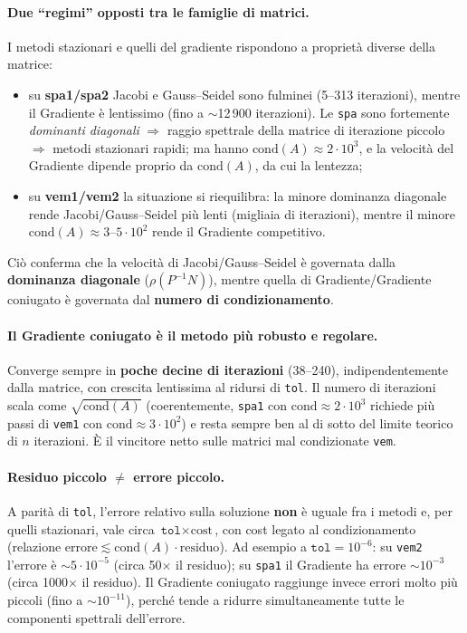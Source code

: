 \documentclass[11pt,a4paper]{article}
\begin{document}
\paragraph{Due ``regimi'' opposti tra le famiglie di matrici.}
I metodi stazionari e quelli del gradiente rispondono a proprietà diverse della
matrice:
\begin{itemize}[leftmargin=1.6em]
  \item su \textbf{spa1/spa2} Jacobi e Gauss--Seidel sono fulminei (5--313
  iterazioni), mentre il Gradiente è lentissimo (fino a $\sim$12\,900
  iterazioni). Le \texttt{spa} sono fortemente \emph{dominanti diagonali}
  $\Rightarrow$ raggio spettrale della matrice di iterazione piccolo
  $\Rightarrow$ metodi stazionari rapidi; ma hanno $\mathrm{cond}(A)\approx
  2\cdot10^3$, e la velocità del Gradiente dipende proprio da $\mathrm{cond}(A)$,
  da cui la lentezza;
  \item su \textbf{vem1/vem2} la situazione si riequilibra: la minore dominanza
  diagonale rende Jacobi/Gauss--Seidel più lenti (migliaia di iterazioni), mentre
  il minore $\mathrm{cond}(A)\approx3$--$5\cdot10^2$ rende il Gradiente
  competitivo.
\end{itemize}
Ciò conferma che la velocità di Jacobi/Gauss--Seidel è governata dalla
\textbf{dominanza diagonale} ($\rho(P^{-1}N)$), mentre quella di
Gradiente/Gradiente coniugato è governata dal \textbf{numero di
condizionamento}.

\paragraph{Il Gradiente coniugato è il metodo più robusto e regolare.}
Converge sempre in \textbf{poche decine di iterazioni} (38--240),
indipendentemente dalla matrice, con crescita lentissima al ridursi di
\texttt{tol}. Il numero di iterazioni scala come $\sqrt{\mathrm{cond}(A)}$
(coerentemente, \texttt{spa1} con $\mathrm{cond}\approx2\cdot10^3$ richiede più
passi di \texttt{vem1} con $\mathrm{cond}\approx3\cdot10^2$) e resta sempre ben al
di sotto del limite teorico di $n$ iterazioni. È il vincitore netto sulle matrici
mal condizionate \texttt{vem}.

\paragraph{Residuo piccolo $\neq$ errore piccolo.}
A parità di \texttt{tol}, l'errore relativo sulla soluzione \textbf{non} è uguale
fra i metodi e, per quelli stazionari, vale circa $\texttt{tol}\times\text{cost}$,
con cost legato al condizionamento (relazione
$\text{errore}\lesssim\mathrm{cond}(A)\cdot\text{residuo}$). Ad esempio a
$\texttt{tol}=10^{-6}$: su \texttt{vem2} l'errore è $\sim5\cdot10^{-5}$ (circa
50$\times$ il residuo); su \texttt{spa1} il Gradiente ha errore
$\sim10^{-3}$ (circa 1000$\times$ il residuo). Il Gradiente coniugato raggiunge
invece errori molto più piccoli (fino a $\sim10^{-11}$), perché tende a ridurre
simultaneamente tutte le componenti spettrali dell'errore.
\end{document}
